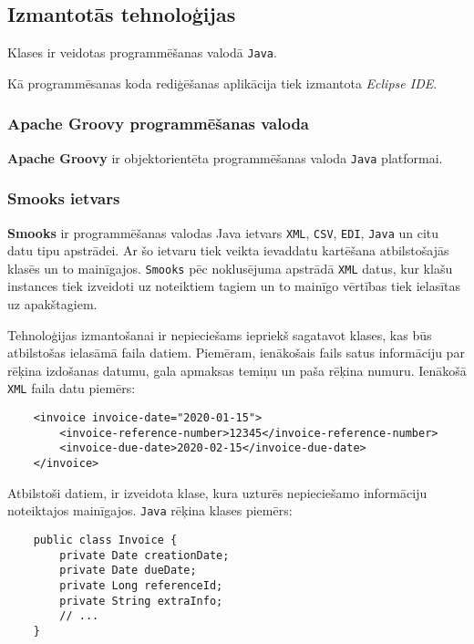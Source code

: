 \subsection{Izmantotās tehnoloģijas}
\par Klases ir veidotas programmēšanas valodā \texttt{Java}.
\par Kā programmēsanas koda rediģēšanas aplikācija tiek izmantota \textit{Eclipse IDE}.

\subsubsection{Apache Groovy programmēšanas valoda}
\par \textbf{Apache Groovy} ir objektorientēta programmēšanas valoda \texttt{Java} platformai.

\subsubsection{Smooks ietvars}
\par \textbf{Smooks} ir programmēšanas valodas Java ietvars \texttt{XML}, \texttt{CSV}, \texttt{EDI}, \texttt{Java} un citu datu tipu apstrādei. Ar šo ietvaru tiek veikta ievaddatu kartēšana atbilstošajās klasēs un to mainīgajos. \texttt{Smooks} pēc noklusējuma apstrādā \texttt{XML} datus, kur klašu instances tiek izveidoti uz noteiktiem tagiem un to mainīgo vērtības tiek ielasītas uz apakštagiem.
\par Tehnoloģijas izmantošanai ir nepieciešams iepriekš sagatavot klases, kas būs atbilstošas ielasāmā faila datiem. Piemēram, ienākošais fails satus informāciju par rēķina izdošanas datumu, gala apmaksas temiņu un paša rēķina numuru.
Ienākošā \texttt{XML} faila datu piemērs:

{
    \begin{verbatim}
    <invoice invoice-date="2020-01-15">
        <invoice-reference-number>12345</invoice-reference-number>
        <invoice-due-date>2020-02-15</invoice-due-date>
    </invoice>
    \end{verbatim}
}

Atbilstoši datiem, ir izveidota klase, kura uzturēs nepieciešamo informāciju noteiktajos mainīgajos.
\texttt{Java} rēķina klases piemērs:
{
    \begin{verbatim}
    public class Invoice {
        private Date creationDate;
        private Date dueDate;
        private Long referenceId;
        private String extraInfo;
        // ...
    }
\end{verbatim}
}

